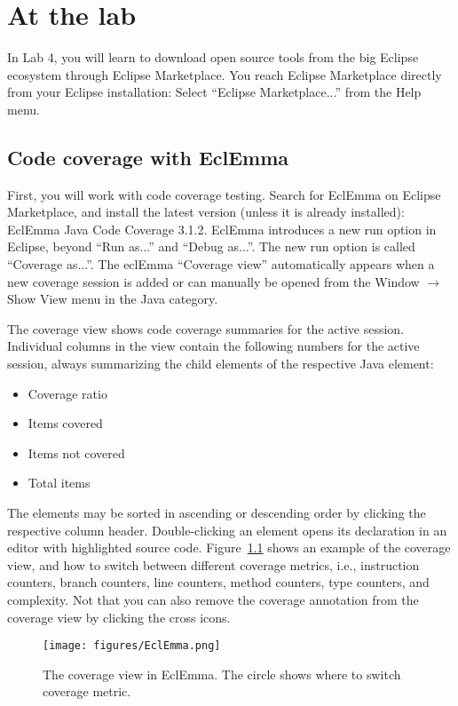 \documentclass{scrreprt}
\begin{document}
\chapter{At the lab} \label{sec:atlab}
In Lab 4, you will learn to download open source tools from the big Eclipse ecosystem through Eclipse Marketplace. You reach Eclipse Marketplace directly from your Eclipse installation: Select ``Eclipse Marketplace...'' from the Help menu.

\section{Code coverage with EclEmma}
First, you will work with code coverage testing. Search for EclEmma on Eclipse Marketplace, and install the latest version (unless it is already installed): EclEmma Java Code Coverage 3.1.2. EclEmma introduces a new run option in Eclipse, beyond ``Run as...'' and ``Debug as...''. The new run option is called ``Coverage as...''. The eclEmma ``Coverage view'' automatically appears when a new coverage session is added or can manually be opened from the Window $\rightarrow$ Show View menu in the Java category. 

The coverage view shows code coverage summaries for the active session. Individual columns in the view contain the following numbers for the active session, always summarizing the child elements of the respective Java element:

\begin{itemize}
\item Coverage ratio
\item Items covered
\item Items not covered
\item Total items
\end{itemize}

The elements may be sorted in ascending or descending order by clicking the respective column header. Double-clicking an element opens its declaration in an editor with highlighted source code. Figure~\ref{fig:eclemma} shows an example of the coverage view, and how to switch between different coverage metrics, i.e., instruction counters, branch counters, line counters, method counters, type counters, and complexity. Not that you can also remove the coverage annotation from the coverage view by clicking the cross icons.

\begin{figure}
\centering
\texttt{[image: figures/EclEmma.png]}
\caption{The coverage view in EclEmma. The circle shows where to switch coverage metric.}
\label{fig:eclemma}
\end{figure}
\end{document}
